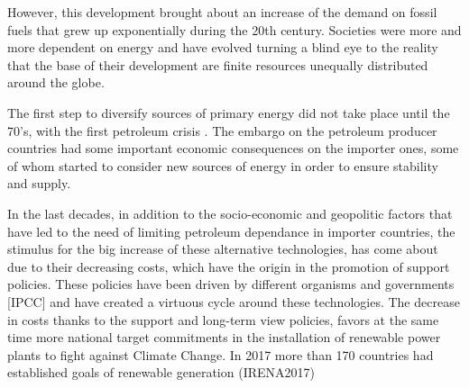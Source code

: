 
However, this development brought about an increase of the demand on fossil fuels that grew up exponentially during the 20th century. Societies were more and more dependent on energy and have evolved turning a blind eye to the reality that the base of their development are finite resources unequally distributed around the globe.


The first step to diversify sources of primary energy did not take place until the 70's, with the first petroleum crisis \cite*{Sorensen1991}. The embargo on the petroleum producer countries had some important economic consequences on the importer ones, some of whom started to consider new sources of energy in order to ensure stability and supply.



In the last decades, in addition to the socio-economic and geopolitic factors that have led to the need of limiting petroleum dependance in importer countries, the stimulus for the big increase of these alternative technologies, has come about due to their decreasing costs, which have the origin in the promotion of support policies. These policies have been driven by different organisms and governments [IPCC] and have created a virtuous cycle around these technologies. The decrease in costs thanks to the support and long-term view policies, favors at the same time more national target commitments in the installation of renewable power plants to fight against Climate Change. In 2017 more than 170 countries had established goals of renewable generation (IRENA2017)

